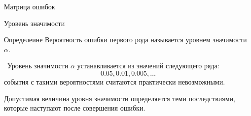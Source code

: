 \documentclass[unicode,11pt,notheorems,xcolor=table]{beamer}
\begin{document}
\begin{frame}{Матрица ошибок}{}
    

\end{frame}

\begin{frame}{Уровень значимости}{}
    
    \begin{block}{Определеине}
        Вероятность ошибки первого рода называется \alert{уровнем значимости $\alpha$}.
    \end{block}
    \
    Уровень значимости $\alpha$ устанавливается из значений следующего ряда:
    $$
        0.05, 0.01, 0.005, \ldots
    $$
    события с такими вероятностями считаются практически невозможными.

    Допустимая величина уровня значимости определяется теми последствиями, которые наступают после совершения ошибки.
\end{frame}
\end{document}
